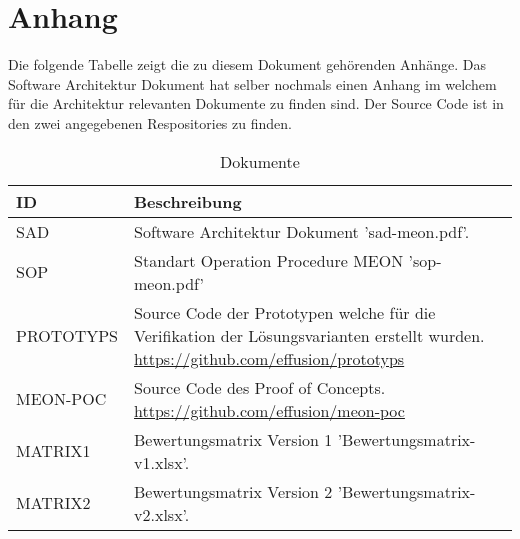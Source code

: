 \chapter{Anhang}
\label{documents}
Die folgende Tabelle zeigt die zu diesem Dokument gehörenden Anhänge. Das Software Architektur Dokument hat selber nochmals einen Anhang im welchem für die Architektur relevanten Dokumente zu finden sind. Der Source Code ist in den zwei angegebenen Respositories zu finden.

\begin{table}[H]
	\centering
	\caption{Dokumente}
	\begin{tabular}{ | p{2cm} | p{13cm} | }
		\toprule
		{\textbf{ID}} & {\textbf{Beschreibung}} \\
		\midrule
		SAD &  Software Architektur Dokument 'sad-meon.pdf'.\\ \hline
		SOP &  Standart Operation Procedure MEON 'sop-meon.pdf'\\ \hline
		PROTOTYPS & Source Code der Prototypen welche für die Verifikation der Lösungsvarianten erstellt wurden. \url{https://github.com/effusion/prototyps} \\ \hline
		MEON-POC &  Source Code des Proof of Concepts. \url{https://github.com/effusion/meon-poc}\\	\hline
		MATRIX1 & Bewertungsmatrix Version 1 'Bewertungsmatrix-v1.xlsx'.\\ \hline
		MATRIX2 & Bewertungsmatrix Version 2 'Bewertungsmatrix-v2.xlsx'.\\
		\bottomrule
	\end{tabular}
\end{table}